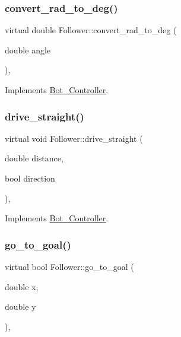 \subsubsection{\texorpdfstring{convert\+\_\+rad\+\_\+to\+\_\+deg()}{convert\_rad\_to\_deg()}}
{\footnotesize\ttfamily virtual double Follower\+::convert\+\_\+rad\+\_\+to\+\_\+deg (\begin{DoxyParamCaption}\item[{double}]{angle }\end{DoxyParamCaption})\hspace{0.3cm}{\ttfamily [override]}, {\ttfamily [virtual]}}



Implements \hyperlink{class_bot___controller_a722a49277ba04f303ca588d80a4910c3}{Bot\+\_\+\+Controller}.

\mbox{\label{class_follower_a0af597b7d7f416c37d85be69377d0b58}} 
\subsubsection{\texorpdfstring{drive\+\_\+straight()}{drive\_straight()}}
{\footnotesize\ttfamily virtual void Follower\+::drive\+\_\+straight (\begin{DoxyParamCaption}\item[{double}]{distance,  }\item[{bool}]{direction }\end{DoxyParamCaption})\hspace{0.3cm}{\ttfamily [override]}, {\ttfamily [virtual]}}



Implements \hyperlink{class_bot___controller_afff936a963b8b3b4b641a7f152b45166}{Bot\+\_\+\+Controller}.

\mbox{\label{class_follower_ab4e7d953f54be23aadd7ed081d01ea2c}} 
\subsubsection{\texorpdfstring{go\+\_\+to\+\_\+goal()}{go\_to\_goal()}}
{\footnotesize\ttfamily virtual bool Follower\+::go\+\_\+to\+\_\+goal (\begin{DoxyParamCaption}\item[{double}]{x,  }\item[{double}]{y }\end{DoxyParamCaption})\hspace{0.3cm}{\ttfamily [override]}, {\ttfamily [virtual]}}



